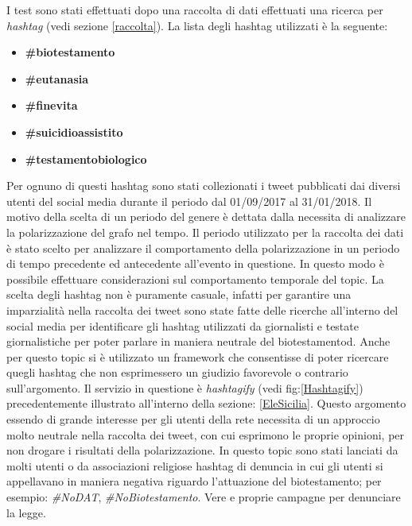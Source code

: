 I test sono stati effettuati dopo una raccolta di dati effettuati una ricerca per \textit{hashtag} (vedi sezione \ref{raccolta}). La lista degli hashtag utilizzati è la seguente:
\begin{itemize}
\item \textbf{\#biotestamento}
\item \textbf{\#eutanasia}
\item \textbf{\#finevita}
\item \textbf{\#suicidioassistito}
\item \textbf{\#testamentobiologico}
\end{itemize}
Per ognuno di questi hashtag sono stati collezionati i tweet pubblicati dai diversi utenti del social media durante il periodo dal 01/09/2017 al 31/01/2018.
Il motivo della scelta di un periodo del genere è dettata dalla necessita di analizzare la polarizzazione del grafo nel tempo. Il periodo utilizzato per la raccolta dei dati è stato scelto per analizzare il comportamento della polarizzazione in un periodo di tempo precedente ed antecedente all'evento in questione. In questo modo è possibile effettuare considerazioni sul comportamento temporale del topic.
La scelta degli hashtag non è puramente casuale, infatti per garantire una imparzialità nella raccolta dei tweet sono state fatte delle ricerche all'interno del social media per identificare gli hashtag utilizzati da giornalisti e testate giornalistiche per poter parlare in maniera neutrale del biotestamentod.
Anche per questo topic si è utilizzato un framework che consentisse di poter ricercare quegli hashtag che non esprimessero un giudizio favorevole o contrario sull'argomento. Il servizio in questione è \textit{hashtagify} (vedi fig:\ref{Hashtagify}) precedentemente illustrato all'interno della sezione: \ref{EleSicilia}.
Questo argomento essendo di grande interesse per gli utenti della rete necessita di un approccio molto neutrale nella raccolta dei tweet, con cui esprimono le proprie opinioni, per non drogare i risultati della polarizzazione.
In questo topic sono stati lanciati da molti utenti o da associazioni religiose hashtag di denuncia in cui gli utenti si appellavano in maniera negativa riguardo l'attuazione del biotestamento; per esempio: \textit{\#NoDAT}, \textit{\#NoBiotestamento}. Vere e proprie campagne per denunciare la legge.

